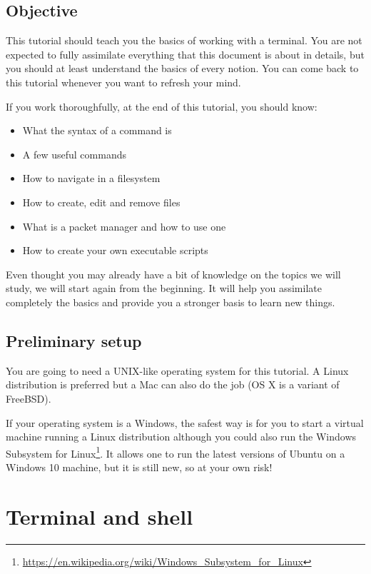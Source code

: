 \documentclass[12pt]{article}
\begin{document}
\subsection{Objective}
This tutorial should teach you the basics of working with a terminal. You are not expected to fully assimilate everything that this document is about in details, but you should at least understand the basics of every notion. You can come back to this tutorial whenever you want to refresh your mind.

If you work thoroughfully, at the end of this tutorial, you should know:

\begin{itemize}
\item What the syntax of a command is
\item A few useful commands
\item How to navigate in a filesystem
\item How to create, edit and remove files
\item What is a packet manager and how to use one
\item How to create your own executable scripts
\end{itemize}

Even thought you may already have a bit of knowledge on the topics we will study, we will start again from the beginning. It will help you assimilate completely the basics and provide you a stronger basis to learn new things.

\subsection{Preliminary setup}

You are going to need a UNIX-like operating system for this tutorial.
A Linux distribution is preferred but a Mac can also do the job (OS X is a variant of FreeBSD).

If your operating system is a Windows, the safest way is for you to start a virtual machine running a Linux distribution although you could also run the Windows Subsystem for Linux\footnote{\url{https://en.wikipedia.org/wiki/Windows_Subsystem_for_Linux}}. It allows one to run the latest versions of Ubuntu on a Windows 10 machine, but it is still new, so at your own risk!



\section{Terminal and shell}
\end{document}
